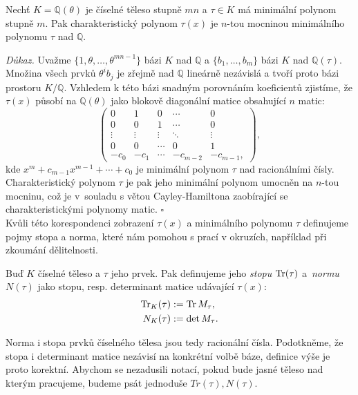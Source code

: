 \documentclass[12pt]{report}
\begin{document}
\begin{lemma}
Nechť $K = \mathbb{Q}(\theta)$ je číselné těleso stupně $mn$ a $\tau \in K$ má minimální polynom stupně $m$. Pak charakteristický polynom $\tau(x)$ je $n$-tou mocninou minimálního polynomu $\tau$ nad $\mathbb{Q}$. 
\end{lemma}
\noindent \textit{Důkaz.} Uvažme $\lbrace 1,\theta,\dots,\theta^{mn-1} \rbrace$ bázi $K$ nad $\mathbb{Q}$ a $\lbrace b_1,\dots,b_m \rbrace$ bázi $K$ nad $\mathbb{Q}(\tau)$. Množina všech prvků $\theta^i b_j$ je zřejmě nad $\mathbb{Q}$ lineárně nezávislá a tvoří proto bázi prostoru $K/\mathbb{Q}$. Vzhledem k této bázi snadným porovnáním koeficientů zjistíme, že $\tau(x)$ působí na $\mathbb{Q}(\theta)$ jako blokově diagonální matice obsahující $n$ matic:
\begin{equation*}
 \begin{pmatrix}
0 & 1 & 0 & \cdots & 0\\
0 & 0 & 1 & \cdots & 0\\
\vdots & \vdots & \vdots & \ddots &\vdots\\
0 & 0 & \cdots & 0& 1\\
-c_0 & -c_1 & \cdots & -c_{m-2} & -c_{m-1},
\end{pmatrix},
\end{equation*}
kde $x^m + c_{m-1} x^{m-1} + \cdots  + c_0$ je minimální polynom $\tau$ nad racionálními čísly. Charakteristický polynom $\tau$ je pak jeho minimální polynom umocněn na $n$-tou mocninu, což je v~souladu s větou Cayley-Hamiltona zaobírající se charakteristickými polynomy matic. \hfill $\square$\\

Kvůli této korespondenci zobrazení $\tau(x)$ a minimálního polynomu $\tau$ definujeme pojmy stopa a norma, které nám pomohou s prací v okruzích, například při zkoumání dělitelnosti.

\begin{definice}
Buď $K$ číselné těleso a $\tau$ jeho prvek. Pak definujeme jeho \textit{stopu} $\operatorname{Tr}(\tau)$ a~\textit{normu} $N(\tau)$ jako stopu, resp. determinant matice udávající $\tau(x)$:
\begin{align*}
\operatorname{Tr}_K(\tau) &:= \operatorname{Tr} M_\tau,\\
N_K(\tau) &:= \det M_{\tau}.
\end{align*} 
\end{definice}

Norma i stopa prvků číselného tělesa jsou tedy racionální čísla. Podotkněme, že stopa i determinant matice nezávisí na konkrétní volbě báze, definice výše je proto korektní. Abychom se nezadusili notací, pokud bude jasné těleso nad kterým pracujeme, budeme psát jednoduše $Tr(\tau),N(\tau)$.
\end{document}
